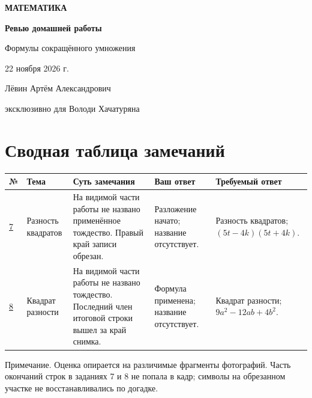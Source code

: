 \documentclass[a4paper,11pt]{article}
\begin{document}
\begin{titlepage}
\thispagestyle{empty}
\centering
\vspace*{47mm}
{\Large\bfseries\color{accent} МАТЕМАТИКА\par}
\vspace{16mm}
{\Huge\bfseries Ревью домашней работы\par}
\vspace{8mm}
{\Large Формулы сокращённого умножения\par}
\vspace{25mm}
{\large 22 ноября 2026 г.\par}
\vfill
{\large Лёвин Артём Александрович\par}
\vspace{2mm}
{\normalsize эксклюзивно для Володи Хачатуряна\par}
\vspace{16mm}
\end{titlepage}

\section*{Сводная таблица замечаний}
\small
\begin{tabularx}{\linewidth}{@{}p{0.9cm}p{2.45cm}X p{2.9cm}p{3.1cm}@{}}
\toprule
\textbf{№} & \textbf{Тема} & \textbf{Суть замечания} & \textbf{Ваш ответ} & \textbf{Требуемый ответ} \\
\midrule
\hyperref[task:7]{7} & Разность квадратов & На видимой части работы не названо применённое тождество. Правый край записи обрезан. & Разложение начато; название отсутствует. & Разность квадратов; $(5t-4k)(5t+4k)$. \\
\addlinespace
\hyperref[task:8]{8} & Квадрат разности & На видимой части работы не названо тождество. Последний член итоговой строки вышел за край снимка. & Формула применена; название отсутствует. & Квадрат разности; $9a^2-12ab+4b^2$. \\
\bottomrule
\end{tabularx}
\normalsize

\vspace{6mm}
\textcolor{muted}{\footnotesize Примечание. Оценка опирается на различимые фрагменты фотографий. Часть окончаний строк в заданиях 7 и 8 не попала в кадр; символы на обрезанном участке не восстанавливались по догадке.}
\end{document}
